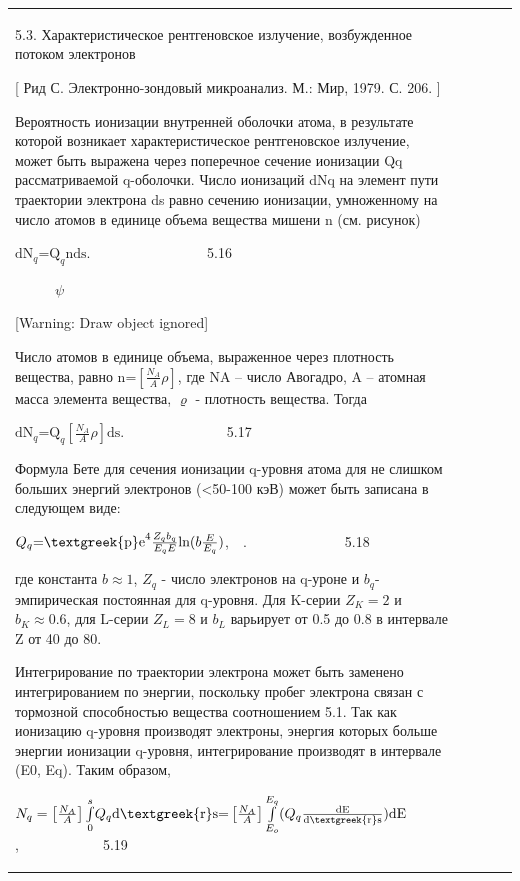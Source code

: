 \documentclass[a4paper,14pt, openany, twoside, draft]{extbook} %
\begin{document}
\begin{flushleft}
\begin{supertabular}{|m{1.7279999cm}|m{1.522cm}|m{1.522cm}|m{1.522cm}|m{1.744cm}|}
5.3. Характеристическое рентгеновское излучение, возбужденное потоком электронов

[ Рид С. Электронно-зондовый микроанализ. М.: Мир, 1979. С. 206. ]

Вероятность ионизации внутренней оболочки атома, в результате которой возникает характеристическое рентгеновское излучение, может быть выражена через поперечное сечение ионизации Qq рассматриваемой q{}-оболочки. Число ионизаций  dNq на элемент пути траектории электрона ds равно сечению ионизации, умноженному на число атомов в единице объема вещества мишени n (см. рисунок)

 ${\text{dN}}_q{\text{=Q}}_q{\text{nds}}$. \ \ \ \ \ \ \ \ \ \ \ \ \ \ \ \ 5.16

\begin{figure}
\centering
\begin{minipage}{0.626cm}
${\psi}$
\end{minipage}
\end{figure}
[Warning: Draw object ignored]

Число атомов в единице объема, выраженное через плотность вещества, равно  ${\text{n=}}\left[\frac{N_A} A\rho \right]$, где NA – число Авогадро, A – атомная масса элемента вещества, ${\varrho}$ {}- плотность вещества. Тогда

 ${\text{dN}}_q{\text{=Q}}_q\left[\frac{N_A} A\rho \right]{\text{ds}}$. \ \ \ \ \ \ \ \ \ \ \ \ \ \ 5.17

Формула Бете для сечения ионизации q{}-уровня атома для не слишком больших энергий электронов ({\textless}50-100 кэВ) может быть записана в следующем виде:

 $Q_q{\text{=\textgreek{p}e}}^4\frac{Z_qb_q}{E_qE}\text{ln}(b\frac E{E_q})$,\ \ .\ \ \ \ \ \ \ \ \ \ \ \ \ \ 5.18

где константа  $b\approx 1$,  $Z_q$ - число электронов на q{}-уроне и  $b_q${}- эмпирическая постоянная для q{}-уровня. Для K{}-серии  $Z_K=2$ и  $b_K\approx 0.6$, для L{}-серии  $Z_L=8$ и  $b_L$ варьирует от 0.5 до 0.8 в интервале Z от 40 до 80.

Интегрирование по траектории электрона может быть заменено интегрированием по энергии, поскольку пробег электрона связан с тормозной способностью вещества соотношением 5.1. Так как ионизацию q{}-уровня производят электроны, энергия которых больше энергии ионизации q{}-уровня, интегрирование производят в интервале (E0, Eq). Таким образом,

 $N_q=\left[\frac{N_A} A\right]\overset s{\underset 0{\int }}Q_q{\text{d\textgreek{r}s=}}\left[\frac{N_A} A\right]\overset{E_q}{\underset{E_o}{\int }}(Q_q\frac{{\text{dE}}}{{\text{d\textgreek{r}s}}}){\text{dE}}$,\ \ \ \ \ \ \ \ \ \ \ \ 5.19


\end{supertabular}
\end{flushleft}
\end{document}
